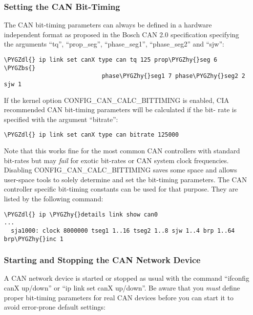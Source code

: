 \documentclass[a4paper,8pt,english]{sphinxmanual}
\def\PYGZbs{\char`\\}
\def\PYGZdl{\char`\$}
\def\PYGZhy{\char`\-}
\begin{document}
\subsubsection{Setting the CAN Bit-Timing}
\label{networking/can:setting-the-can-bit-timing}
The CAN bit-timing parameters can always be defined in a hardware
independent format as proposed in the Bosch CAN 2.0 specification
specifying the arguments ``tq'', ``prop\_seg'', ``phase\_seg1'', ``phase\_seg2''
and ``sjw'':

\begin{Verbatim}[commandchars=\\\{\}]
\PYGZdl{} ip link set canX type can tq 125 prop\PYGZhy{}seg 6 \PYGZbs{}
                            phase\PYGZhy{}seg1 7 phase\PYGZhy{}seg2 2 sjw 1
\end{Verbatim}

If the kernel option CONFIG\_CAN\_CALC\_BITTIMING is enabled, CIA
recommended CAN bit-timing parameters will be calculated if the bit-
rate is specified with the argument ``bitrate'':

\begin{Verbatim}[commandchars=\\\{\}]
\PYGZdl{} ip link set canX type can bitrate 125000
\end{Verbatim}

Note that this works fine for the most common CAN controllers with
standard bit-rates but may \emph{fail} for exotic bit-rates or CAN system
clock frequencies. Disabling CONFIG\_CAN\_CALC\_BITTIMING saves some
space and allows user-space tools to solely determine and set the
bit-timing parameters. The CAN controller specific bit-timing
constants can be used for that purpose. They are listed by the
following command:

\begin{Verbatim}[commandchars=\\\{\}]
\PYGZdl{} ip \PYGZhy{}details link show can0
...
  sja1000: clock 8000000 tseg1 1..16 tseg2 1..8 sjw 1..4 brp 1..64 brp\PYGZhy{}inc 1
\end{Verbatim}


\subsubsection{Starting and Stopping the CAN Network Device}
\label{networking/can:starting-and-stopping-the-can-network-device}
A CAN network device is started or stopped as usual with the command
``ifconfig canX up/down'' or ``ip link set canX up/down''. Be aware that
you \emph{must} define proper bit-timing parameters for real CAN devices
before you can start it to avoid error-prone default settings:
\end{document}
